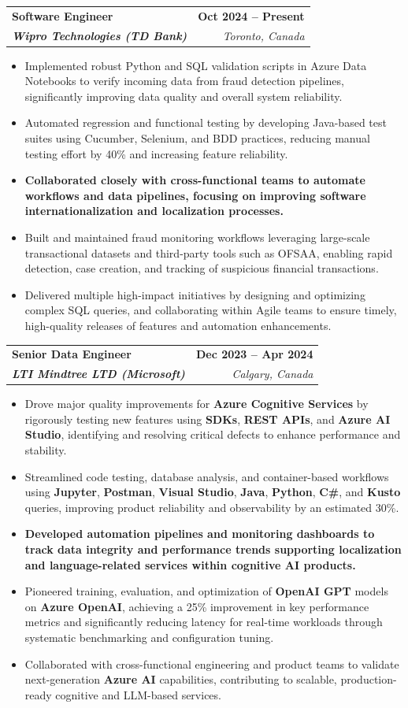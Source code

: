 \documentclass[letterpaper,11pt]{article}
\makeatletter
\newcommand{\resumeItem}[1]{
  \item\small{
    {#1 \vspace{-2pt}}
  }
}
\newcommand{\resumeSubheading}[4]{
  \vspace{-2pt}\item
    \begin{tabular*}{1.0\textwidth}[t]{l@{\extracolsep{\fill}}r}
      \textbf{#1} & \textbf{\small #2} \\
      \textit{\small#3} & \textit{\small #4} \\
    \end{tabular*}\vspace{-7pt}
}
\newcommand{\resumeItemListStart}{\begin{itemize}}
\newcommand{\resumeItemListEnd}{\end{itemize}\vspace{-5pt}}
\makeatother
\begin{document}
    \resumeSubheading
      {\textbf{Software Engineer}}{\textbf{Oct 2024 -- Present}}
      {\textbf{Wipro Technologies (TD Bank)}}{Toronto, Canada}
      \resumeItemListStart
        \resumeItem{Implemented robust Python and SQL validation scripts in Azure Data Notebooks to verify incoming data from fraud detection pipelines, significantly improving data quality and overall system reliability.}
        \resumeItem{Automated regression and functional testing by developing Java-based test suites using Cucumber, Selenium, and BDD practices, reducing manual testing effort by 40\% and increasing feature reliability.}
        \resumeItem{\textbf{Collaborated closely with cross-functional teams to automate workflows and data pipelines, focusing on improving software internationalization and localization processes.}}
        \resumeItem{Built and maintained fraud monitoring workflows leveraging large-scale transactional datasets and third-party tools such as OFSAA, enabling rapid detection, case creation, and tracking of suspicious financial transactions.}
        \resumeItem{Delivered multiple high-impact initiatives by designing and optimizing complex SQL queries, and collaborating within Agile teams to ensure timely, high-quality releases of features and automation enhancements.}
      \resumeItemListEnd

    \resumeSubheading
      {\textbf{Senior Data Engineer}}{\textbf{Dec 2023 -- Apr 2024}}
      {\textbf{LTI Mindtree LTD (Microsoft)}}{Calgary, Canada}
      \resumeItemListStart
        \resumeItem{Drove major quality improvements for \textbf{Azure Cognitive Services} by rigorously testing new features using \textbf{SDKs}, \textbf{REST APIs}, and \textbf{Azure AI Studio}, identifying and resolving critical defects to enhance performance and stability.}
        \resumeItem{Streamlined code testing, database analysis, and container-based workflows using \textbf{Jupyter}, \textbf{Postman}, \textbf{Visual Studio}, \textbf{Java}, \textbf{Python}, \textbf{C\#}, and \textbf{Kusto} queries, improving product reliability and observability by an estimated 30\%.}
        \resumeItem{\textbf{Developed automation pipelines and monitoring dashboards to track data integrity and performance trends supporting localization and language-related services within cognitive AI products.}}
        \resumeItem{Pioneered training, evaluation, and optimization of \textbf{OpenAI GPT} models on \textbf{Azure OpenAI}, achieving a 25\% improvement in key performance metrics and significantly reducing latency for real-time workloads through systematic benchmarking and configuration tuning.}
        \resumeItem{Collaborated with cross-functional engineering and product teams to validate next-generation \textbf{Azure AI} capabilities, contributing to scalable, production-ready cognitive and LLM-based services.}
      \resumeItemListEnd
\end{document}
